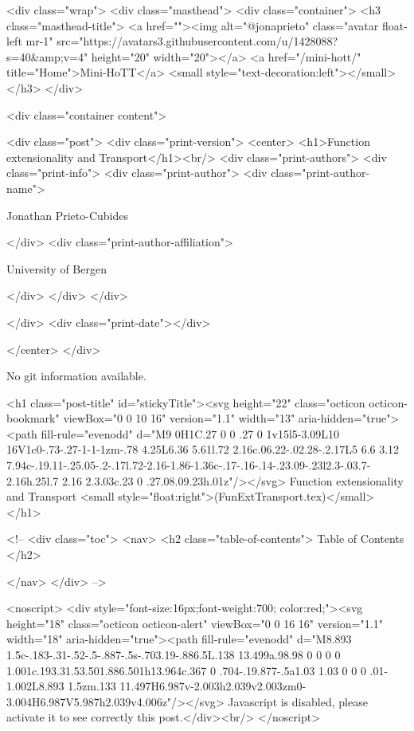     <div class="wrap">
      <div class="masthead">
        <div class="container">
          <h3 class="masthead-title">
            <a href=""><img alt="@jonaprieto" class="avatar float-left mr-1" src="https://avatars3.githubusercontent.com/u/1428088?s=40&amp;v=4" height="20" width="20"></a>
            <a href="/mini-hott/" title="Home">Mini-HoTT</a>
            <small style="text-decoration:left"></small>
          </h3>
        </div>
      
      <div class="container content">
        







<div class="post">
  <div class="print-version">
    <center>
      <h1>Function extensionality and Transport</h1><br/>
        <div class="print-authors">
          <div class="print-info">
            <div class="print-author">
              <div class="print-author-name">
                
                  Jonathan Prieto-Cubides
                
              </div>
              <div class="print-author-affiliation">
                
                  University of Bergen
                
                </div>
            </div>
          </div>
          
          
        </div>
        <div class="print-date"></div>
        
        
    </center>
  </div>

  
  No git information available.
  

  <h1 class="post-title" id="stickyTitle"><svg height="22" class="octicon octicon-bookmark" viewBox="0 0 10 16" version="1.1" width="13" aria-hidden="true"><path fill-rule="evenodd" d="M9 0H1C.27 0 0 .27 0 1v15l5-3.09L10 16V1c0-.73-.27-1-1-1zm-.78 4.25L6.36 5.61l.72 2.16c.06.22-.02.28-.2.17L5 6.6 3.12 7.94c-.19.11-.25.05-.2-.17l.72-2.16-1.86-1.36c-.17-.16-.14-.23.09-.23l2.3-.03.7-2.16h.25l.7 2.16 2.3.03c.23 0 .27.08.09.23h.01z"/></svg> Function extensionality and Transport <small style="float:right">(FunExtTransport.tex)</small>
  </h1>

  <!-- 
  <div class="toc">
    <nav>
    <h2 class="table-of-contents"> Table of Contents </h2>
      

    </nav>
  </div>
   -->

  <noscript>
  <div style="font-size:16px;font-weight:700; color:red;"><svg height="18" class="octicon octicon-alert" viewBox="0 0 16 16" version="1.1" width="18" aria-hidden="true"><path fill-rule="evenodd" d="M8.893 1.5c-.183-.31-.52-.5-.887-.5s-.703.19-.886.5L.138 13.499a.98.98 0 0 0 0 1.001c.193.31.53.501.886.501h13.964c.367 0 .704-.19.877-.5a1.03 1.03 0 0 0 .01-1.002L8.893 1.5zm.133 11.497H6.987v-2.003h2.039v2.003zm0-3.004H6.987V5.987h2.039v4.006z"/></svg> Javascript is disabled, please activate it to see correctly this post.</div><br/>
  </noscript>

